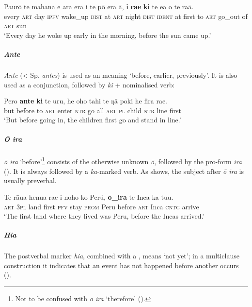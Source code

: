 \ea\label{ex:11.234}
\gll Paurō te mahana e {\ꞌ}ara era {\ꞌ}i te pō era {\ꞌ}ā, \textbf{{\ꞌ}i} \textbf{ra{\ꞌ}e} \textbf{ki} te e{\ꞌ}a  o te ra{\ꞌ}ā.\\
every \textsc{art} day \textsc{ipfv} wake\_up \textsc{dist} at \textsc{art} night \textsc{dist} \textsc{ident} at first to \textsc{art} go\_out  of \textsc{art} sun\\

\glt 
‘Every day he woke up early in the morning, before the sun came up.’ \textstyleExampleref{[R448.003]} 
\z

\subparagraph{\textit{Ante}} \textit{Ante} ({\textless} Sp. \textit{antes}) is used as an  meaning ‘before, earlier, previously’. It is also used as a conjunction, followed by \textit{ki} + nominalised verb:

\ea\label{ex:11.235}
\gll Pero \textbf{ante} \textbf{ki} te uru, he oho tahi te ŋā poki he fira ra{\ꞌ}e. \\
but before to \textsc{art} enter \textsc{ntr} go all \textsc{art} \textsc{pl} child \textsc{ntr} line first \\

\glt 
‘But before going in, the children first go and stand in line.’ \textstyleExampleref{[R151.012]} 
\z

\subparagraph{\textit{{\ꞌ}Ō ira}} \textit{{\ꞌ}ō ira} ‘before’\footnote{\label{fn:531}Not to be confused with \textit{{\ꞌ}o ira} ‘therefore’ ().} consists of the otherwise unknown  \textit{{\ꞌ}ō}, followed by the pro-form \textit{ira} (). It is always followed by a \textit{ka}{}-marked verb. As  shows, the subject after \textit{{\ꞌ}ō ira} is usually preverbal.

\ea\label{ex:11.236}
\gll Te rāua henua ra{\ꞌ}e i noho ko Perú, \textbf{{\ꞌ}ō\_ira} te Inca ka tu{\ꞌ}u. \\
\textsc{art} \textsc{3pl} land first \textsc{pfv} stay \textsc{prom} Peru  before \textsc{art} Inca \textsc{cntg} arrive \\

\glt 
‘The first land where they lived was Peru, before the Incas arrived.’ \textstyleExampleref{[R376.011]} 
\z

\subparagraph{\textit{Hia}} The postverbal marker \textit{hia}, combined with a , means ‘not yet’; in a multiclause construction it indicates that an event has not happened before another occurs ().

